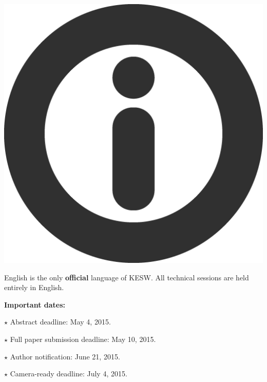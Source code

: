 \documentclass[a4paper, 10pt]{article}
\renewcommand{\skip}{\vspace{1ex}}
\renewcommand{\bullet}{\ensuremath{\star} }
\begin{document}
\skip\skip

\begin{minipage}{.10\textwidth}
\includegraphics[width=\textwidth]{information}
\end{minipage}
\hfill
\begin{minipage}{.82\textwidth}
English is the only \textbf{official} language of KESW. All technical sessions
are held entirely in English.
\end{minipage}

\skip\skip

\noindent\textbf{Important dates:}

\skip

\noindent
\bullet Abstract deadline: May 4, 2015.

\noindent
\bullet Full paper submission deadline: May 10, 2015.

\noindent
\bullet Author notification: June 21, 2015.

\noindent
\bullet Camera-ready deadline: July 4, 2015.

\skip
\end{document}
